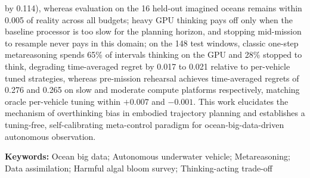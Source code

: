 by 0.114), whereas evaluation on the 16 held-out imagined oceans remains within 0.005 of reality across all budgets; heavy GPU thinking pays off only when the baseline processor is too slow for the planning horizon, and stopping mid-mission to resample never pays in this domain; on the 148 test windows, classic one-step metareasoning spends 65\% of intervals thinking on the GPU and 28\% stopped to think, degrading time-averaged regret by 0.017 to 0.021 relative to per-vehicle tuned strategies, whereas pre-mission rehearsal achieves time-averaged regrets of 0.276 and 0.265 on slow and moderate compute platforms respectively, matching oracle per-vehicle tuning within $+0.007$ and $-0.001$. This work elucidates the mechanism of overthinking bias in embodied trajectory planning and establishes a tuning-free, self-calibrating meta-control paradigm for ocean-big-data-driven autonomous observation.

\vspace{1em}
\noindent\textbf{Keywords: }Ocean big data; Autonomous underwater vehicle; Metareasoning; Data assimilation; Harmful algal bloom survey; Thinking-acting trade-off
